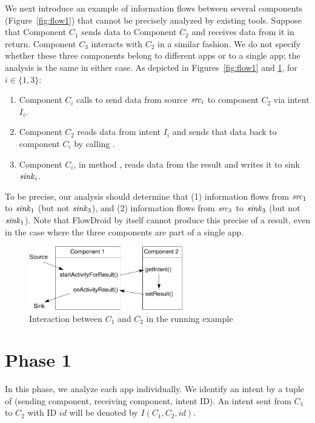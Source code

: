 We next introduce an example of information flows between several
components (Figure~\ref{fig:flow1}) that cannot be precisely analyzed
by existing tools.
Suppose that Component $C_1$ sends data to Component $C_2$ and
receives data from it in return.  Component $C_3$ interacts with $C_2$ in a similar fashion.  We do not specify whether these three components belong to different apps or to a single app; the analysis is the same in either case.  As depicted in Figures~\ref{fig:flow1} and \ref{fig:intents-inflow-outflow}, for $i \in \{1,3\}$:
\begin{enumerate}
\item
    Component $C_i$ calls  to send data from source $\mathit{src}_i$ to component $C_2$ via intent $I_i$.
\item
    Component $C_2$ reads data from intent $I_i$ and sends that data back to
    component $C_i$ by calling .
\item
    Component $C_i$, in method , reads data from the result and writes it to sink $\mathit{sink}_i$.
\end{enumerate}
%
To be precise, our analysis should determine that 
(1) information flows from $\mathit{src}_1$ to $\mathit{sink}_1$ (but not $\mathit{sink}_3$),
and (2) information flows from $\mathit{src}_3$ to $\mathit{sink}_3$ (but not $\mathit{sink}_1$).  
Note that FlowDroid by itself cannot produce this precise of a result, even in
the case where the three components are part of a single app.


\begin{figure}[b]
\center
\includegraphics[width=0.6\textwidth]{small-in-out-flows.pdf}
\caption{Interaction between $C_1$ and $C_2$ in the running
  example}
\label{fig:intents-inflow-outflow}
\end{figure}

\def\ResultOf{R}
\def\IntentCons{I}
\def\Null{\tsf{null}}
\section{Phase 1} 
In this phase, we analyze each app individually.  We identify an
intent by a tuple of (sending component, receiving component, intent ID).  
An intent sent from $C_1$ to
$C_2$ with ID $id$ will be denoted by $\IntentCons(C_1, C_2, id)$.

